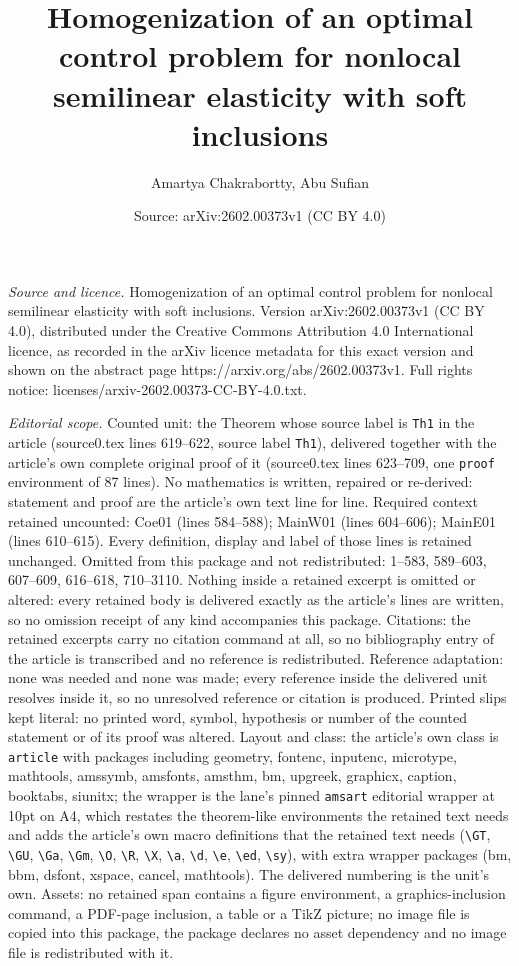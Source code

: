 \documentclass[10pt,a4paper]{amsart}
\title[Homogenization of an optimal control problem for nonlocal se]{Homogenization of an optimal control problem for nonlocal semilinear elasticity with soft inclusions}
\author{Amartya Chakrabortty, Abu Sufian}
\date{Source: arXiv:2602.00373v1 (CC BY 4.0)}
\begin{document}
\maketitle

\noindent\emph{Source and licence.} Homogenization of an optimal control problem for nonlocal semilinear elasticity with soft inclusions. Version arXiv:2602.00373v1 (CC BY 4.0), distributed under the Creative Commons Attribution 4.0 International licence, as recorded in the arXiv licence metadata for this exact version and shown on the abstract page https://arxiv.org/abs/2602.00373v1. Full rights notice: licenses/arxiv-2602.00373-CC-BY-4.0.txt.\par\smallskip

\noindent\textit{Editorial scope.} Counted unit: the Theorem whose source label is \texttt{Th1} in the article (source0.tex lines 619--622, source label \texttt{Th1}), delivered together with the article's own complete original proof of it (source0.tex lines 623--709, one \texttt{proof} environment of 87 lines). No mathematics is written, repaired or re-derived: statement and proof are the article's own text line for line. Required context retained uncounted: Coe01 (lines 584--588); MainW01 (lines 604--606); MainE01 (lines 610--615). Every definition, display and label of those lines is retained unchanged. Omitted from this package and not redistributed: 1--583, 589--603, 607--609, 616--618, 710--3110. Nothing inside a retained excerpt is omitted or altered: every retained body is delivered exactly as the article's lines are written, so no omission receipt of any kind accompanies this package. Citations: the retained excerpts carry no citation command at all, so no bibliography entry of the article is transcribed and no reference is redistributed. Reference adaptation: none was needed and none was made; every reference inside the delivered unit resolves inside it, so no unresolved reference or citation is produced. Printed slips kept literal: no printed word, symbol, hypothesis or number of the counted statement or of its proof was altered. Layout and class: the article's own class is \texttt{article} with packages including geometry, fontenc, inputenc, microtype, mathtools, amssymb, amsfonts, amsthm, bm, upgreek, graphicx, caption, booktabs, siunitx; the wrapper is the lane's pinned \texttt{amsart} editorial wrapper at 10pt on A4, which restates the theorem-like environments the retained text needs and adds the article's own macro definitions that the retained text needs (\texttt{\textbackslash GT}, \texttt{\textbackslash GU}, \texttt{\textbackslash Ga}, \texttt{\textbackslash Gm}, \texttt{\textbackslash O}, \texttt{\textbackslash R}, \texttt{\textbackslash X}, \texttt{\textbackslash a}, \texttt{\textbackslash d}, \texttt{\textbackslash e}, \texttt{\textbackslash ed}, \texttt{\textbackslash sy}), with extra wrapper packages (bm, bbm, dsfont, xspace, cancel, mathtools). The delivered numbering is the unit's own. Assets: no retained span contains a figure environment, a graphics-inclusion command, a PDF-page inclusion, a table or a TikZ picture; no image file is copied into this package, the package declares no asset dependency and no image file is redistributed with it. 
\end{document}
